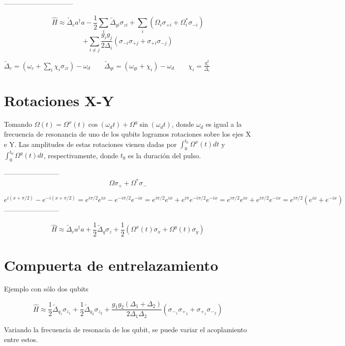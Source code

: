 ------------------------------

$$\hat{H} \approx \tilde{\Delta}_c a^\dagger a - \frac{1}{2} \sum\limits_i \tilde{\Delta}_{qi} \sigma_{zi} + \sum\limits_i (\Omega_i \sigma_{+i} + \Omega_i^* \sigma_{-i})$$
$$+ \sum\limits_{i \neq j} \frac{g_i g_j}{2 \Delta_i} (\sigma_{-i} \sigma_{+j}+\sigma_{+i} \sigma_{-j})$$

$\tilde{\Delta}_c = (\omega_c + \sum\limits_i \chi_i \sigma_{zi}) - \omega_d \qquad \tilde{\Delta}_{qi} = (\omega_{qi} + \chi_i) - \omega_d \qquad \chi_i = \frac{g_i^2}{\Delta_i}$

\section{Rotaciones X-Y}

Tomando $\Omega(t) = \Omega^x(t) \cos(\omega_d t) + \Omega^y \sin(\omega_d t)$, donde $\omega_d$ es igual a la frecuencia de resonancia de uno de los qubits logramos rotaciones sobre los ejes X e Y. Las amplitudes de estas rotaciones vienen dadas por $\int_0^{t_0} \Omega^x(t) dt$ y $\int_0^{t_0} \Omega^y(t) dt$, respectivamente, donde $t_0$ es la duración del pulso.

------------------------
$$ \Omega \sigma_+ + \Omega^* \sigma_- $$

$$ e^{i(x+\pi/2)}-e^{-i(x+\pi/2)} = e^{i\pi/2}e^{ix}-e^{-i\pi/2}e^{-ix} =
e^{i\pi/2}e^{ix}+e^{i\pi}e^{-i\pi/2}e^{-ix} = e^{i\pi/2}e^{ix}+e^{i\pi/2}e^{-ix} = e^{i\pi/2}(e^{ix}+e^{-ix})$$
------------------------

$$\hat{H} \approx \tilde{\Delta}_c a^\dagger a + \frac{1}{2} \tilde{\Delta}_q \sigma_z + \frac{1}{2} (\Omega^x(t) \sigma_x + \Omega^y(t) \sigma_y)$$

\section{Compuerta de entrelazamiento}

Ejemplo con sólo dos qubits

$$\hat{H} \approx \frac{1}{2} \tilde{\Delta}_{q_1} \sigma_{z_1} + \frac{1}{2} \tilde{\Delta}_{q_2} \sigma_{z_2} + \frac{g_1 g_2 (\Delta_1 + \Delta_2)}{2 \Delta_1 \Delta_2} (\sigma_{-_1} \sigma_{+_2} + \sigma_{+_1} \sigma_{-_2})$$

Variando la frecuencia de resonacia de los qubit, se puede variar el acoplamiento entre estos. 


